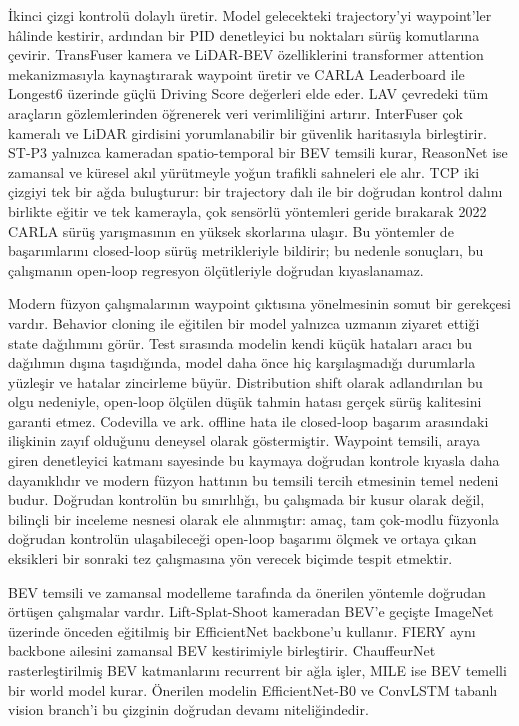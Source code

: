 \documentclass[conference]{IEEEtran}
\begin{document}
İkinci çizgi kontrolü dolaylı üretir. Model gelecekteki trajectory'yi waypoint'ler hâlinde kestirir, ardından bir PID denetleyici bu noktaları sürüş komutlarına çevirir. TransFuser \cite{Prakash21Transfuser,Chitta23Transfuser} kamera ve LiDAR-BEV özelliklerini transformer attention mekanizmasıyla kaynaştırarak waypoint üretir ve CARLA Leaderboard ile Longest6 üzerinde güçlü Driving Score değerleri elde eder. LAV \cite{Chen22LAV} çevredeki tüm araçların gözlemlerinden öğrenerek veri verimliliğini artırır. InterFuser \cite{Shao22Interfuser} çok kameralı ve LiDAR girdisini yorumlanabilir bir güvenlik haritasıyla birleştirir. ST-P3 \cite{Hu22STP3} yalnızca kameradan spatio-temporal bir BEV temsili kurar, ReasonNet \cite{Shao23ReasonNet} ise zamansal ve küresel akıl yürütmeyle yoğun trafikli sahneleri ele alır. TCP \cite{Wu22TCP} iki çizgiyi tek bir ağda buluşturur: bir trajectory dalı ile bir doğrudan kontrol dalını birlikte eğitir ve tek kamerayla, çok sensörlü yöntemleri geride bırakarak 2022 CARLA sürüş yarışmasının en yüksek skorlarına ulaşır. Bu yöntemler de başarımlarını closed-loop sürüş metrikleriyle bildirir; bu nedenle sonuçları, bu çalışmanın open-loop regresyon ölçütleriyle doğrudan kıyaslanamaz.

Modern füzyon çalışmalarının waypoint çıktısına yönelmesinin somut bir gerekçesi vardır. Behavior cloning ile eğitilen bir model yalnızca uzmanın ziyaret ettiği state dağılımını görür. Test sırasında modelin kendi küçük hataları aracı bu dağılımın dışına taşıdığında, model daha önce hiç karşılaşmadığı durumlarla yüzleşir ve hatalar zincirleme büyür. Distribution shift olarak adlandırılan bu olgu nedeniyle, open-loop ölçülen düşük tahmin hatası gerçek sürüş kalitesini garanti etmez. Codevilla ve ark. \cite{CodevillaOffline18} offline hata ile closed-loop başarım arasındaki ilişkinin zayıf olduğunu deneysel olarak göstermiştir. Waypoint temsili, araya giren denetleyici katmanı sayesinde bu kaymaya doğrudan kontrole kıyasla daha dayanıklıdır ve modern füzyon hattının bu temsili tercih etmesinin temel nedeni budur. Doğrudan kontrolün bu sınırlılığı, bu çalışmada bir kusur olarak değil, bilinçli bir inceleme nesnesi olarak ele alınmıştır: amaç, tam çok-modlu füzyonla doğrudan kontrolün ulaşabileceği open-loop başarımı ölçmek ve ortaya çıkan eksikleri bir sonraki tez çalışmasına yön verecek biçimde tespit etmektir.

BEV temsili ve zamansal modelleme tarafında da önerilen yöntemle doğrudan örtüşen çalışmalar vardır. Lift-Splat-Shoot \cite{Philion20LSS} kameradan BEV'e geçişte ImageNet üzerinde önceden eğitilmiş bir EfficientNet backbone'u kullanır. FIERY \cite{Hu21Fiery} aynı backbone ailesini zamansal BEV kestirimiyle birleştirir. ChauffeurNet \cite{Bansal19Chauffeur} rasterleştirilmiş BEV katmanlarını recurrent bir ağla işler, MILE \cite{Hu22MILE} ise BEV temelli bir world model kurar. Önerilen modelin EfficientNet-B0 ve ConvLSTM tabanlı vision branch'i bu çizginin doğrudan devamı niteliğindedir.
\end{document}

